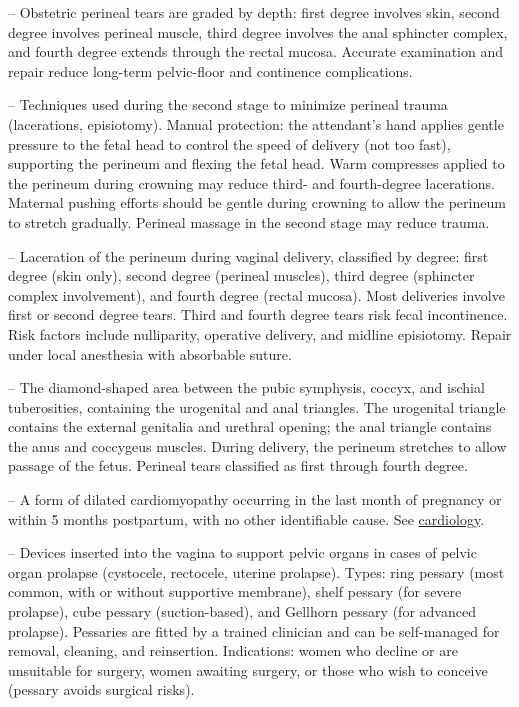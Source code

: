 -- Obstetric perineal tears are graded by depth: first degree involves skin, second degree involves perineal muscle, third degree involves the anal sphincter complex, and fourth degree extends through the rectal mucosa. Accurate examination and repair reduce long-term pelvic-floor and continence complications.

-- Techniques used during the second stage to minimize perineal trauma (lacerations, episiotomy). Manual protection: the attendant's hand applies gentle pressure to the fetal head to control the speed of delivery (not too fast), supporting the perineum and flexing the fetal head. Warm compresses applied to the perineum during crowning may reduce third- and fourth-degree lacerations. Maternal pushing efforts should be gentle during crowning to allow the perineum to stretch gradually. Perineal massage in the second stage may reduce trauma.

-- Laceration of the perineum during vaginal delivery, classified by degree: first degree (skin only), second degree (perineal muscles), third degree (sphincter complex involvement), and fourth degree (rectal mucosa). Most deliveries involve first or second degree tears. Third and fourth degree tears risk fecal incontinence. Risk factors include nulliparity, operative delivery, and midline episiotomy. Repair under local anesthesia with absorbable suture.

-- The diamond-shaped area between the pubic symphysis, coccyx, and ischial tuberosities, containing the urogenital and anal triangles. The urogenital triangle contains the external genitalia and urethral opening; the anal triangle contains the anus and coccygeus muscles. During delivery, the perineum stretches to allow passage of the fetus. Perineal tears classified as first through fourth degree.

-- A form of dilated cardiomyopathy occurring in the last month of pregnancy or within 5 months postpartum, with no other identifiable cause. See \hyperlink{Cardiology}{cardiology}.

-- Devices inserted into the vagina to support pelvic organs in cases of pelvic organ prolapse (cystocele, rectocele, uterine prolapse). Types: ring pessary (most common, with or without supportive membrane), shelf pessary (for severe prolapse), cube pessary (suction-based), and Gellhorn pessary (for advanced prolapse). Pessaries are fitted by a trained clinician and can be self-managed for removal, cleaning, and reinsertion. Indications: women who decline or are unsuitable for surgery, women awaiting surgery, or those who wish to conceive (pessary avoids surgical risks).

